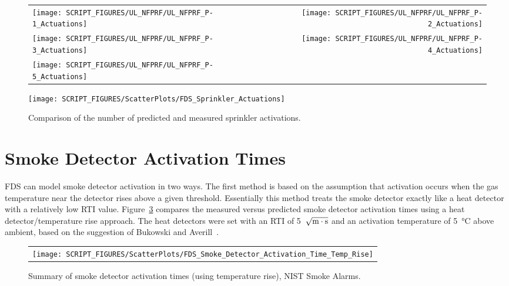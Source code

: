 \begin{figure}[p]
\begin{tabular*}{\textwidth}{l@{\extracolsep{\fill}}r}
\texttt{[image: SCRIPT\_FIGURES/UL\_NFPRF/UL\_NFPRF\_P-1\_Actuations]} &
\texttt{[image: SCRIPT\_FIGURES/UL\_NFPRF/UL\_NFPRF\_P-2\_Actuations]} \\
\texttt{[image: SCRIPT\_FIGURES/UL\_NFPRF/UL\_NFPRF\_P-3\_Actuations]} &
\texttt{[image: SCRIPT\_FIGURES/UL\_NFPRF/UL\_NFPRF\_P-4\_Actuations]} \\
\texttt{[image: SCRIPT\_FIGURES/UL\_NFPRF/UL\_NFPRF\_P-5\_Actuations]} &
\end{tabular*}
\label{UL_NFPRF_3_1}
\end{figure}

\begin{figure}[p]
\begin{center}
\texttt{[image: SCRIPT\_FIGURES/ScatterPlots/FDS\_Sprinkler\_Actuations]}
\end{center}
\caption[Comparison of the number of predicted and measured sprinkler activations]
{Comparison of the number of predicted and measured sprinkler activations.}
\label{UL_NFPRF}
\end{figure}




\clearpage

\section{Smoke Detector Activation Times}

FDS can model smoke detector activation in two ways. The first method is based on the assumption that activation occurs when the gas temperature near the detector rises above a given threshold. Essentially this method treats the smoke detector exactly like a heat detector with a relatively low RTI value. Figure~\ref{NIST_Smoke_Alarms_Scatterplot_Temp_Rise} compares the measured versus predicted smoke detector activation times using a heat detector/temperature rise approach. The heat detectors were set with an RTI of 5~$\sqrt{\hbox{m}\cdot \hbox{s}}$ and an activation temperature of \SI{5}{\celsius} above ambient, based on the suggestion of Bukowski and Averill~\cite{Bukowski:2}.

\begin{figure}[h!]
\begin{center}
\begin{tabular}{c}
\texttt{[image: SCRIPT\_FIGURES/ScatterPlots/FDS\_Smoke\_Detector\_Activation\_Time\_Temp\_Rise]}
\end{tabular}
\end{center}
\caption[Summary of smoke detector activation times (temperature rise), NIST Smoke Alarms.]
{Summary of smoke detector activation times (using temperature rise), NIST Smoke Alarms.}
\label{NIST_Smoke_Alarms_Scatterplot_Temp_Rise}
\end{figure}

